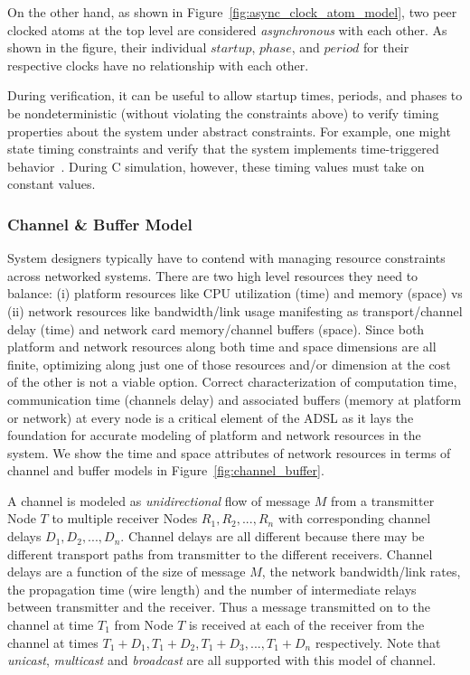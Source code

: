 On the other hand, as shown in Figure~\ref{fig:async_clock_atom_model}, two peer clocked atoms at the top level are considered \emph{asynchronous} with each other. As shown in the figure, their individual $startup$, $phase$, and $period$ for their respective clocks have no relationship with each other.

During verification, it can be useful to allow startup times, periods, and phases to be nondeterministic (without violating the constraints above) to verify timing properties about the system under abstract constraints. For example, one might state timing constraints and verify that the system implements time-triggered behavior~\cite{fmcad07}. During C simulation, however, these timing values must take on constant values.


\subsubsection{Channel \& Buffer Model}
\label{subsubsec:channel_buffer_model}


System designers typically have to contend with managing resource constraints across networked systems. There are two high level resources they need to balance: (i) platform resources like CPU utilization (time) and memory (space) vs (ii) network resources like bandwidth/link usage manifesting as transport/channel delay (time) and network card memory/channel buffers (space). Since both platform and network resources along both time and space dimensions are all finite, optimizing along just one of those resources and/or dimension at the cost of the other is not a viable option. Correct characterization of computation time, communication time (channels delay) and associated buffers (memory at platform or network) at every node is a critical element of the ADSL as it lays the foundation for accurate modeling of platform and network resources in the system.  We show the time and space attributes of network resources in terms of channel and buffer models in Figure~\ref{fig:channel_buffer}. 

A channel is modeled as \emph{unidirectional} flow of message $M$ from a transmitter Node $T$ to multiple receiver Nodes $R_1,R_2,...,R_n$ with corresponding channel delays $D_1,D_2,...,D_n$. Channel delays are all different because there may be different transport paths from transmitter to the different receivers. Channel delays are a function of the size of message $M$, the network bandwidth/link rates, the propagation time (wire length) and the number of intermediate relays between transmitter and the receiver. Thus a message transmitted on to the channel at time $T_1$ from Node $T$ is received at each of the receiver from the channel at times $T_1+D_1, T_1+D_2, T_1+D_3,...,T_1+D_n$ respectively. Note that \emph{unicast}, \emph{multicast} and \emph{broadcast} are all supported with this model of channel.

